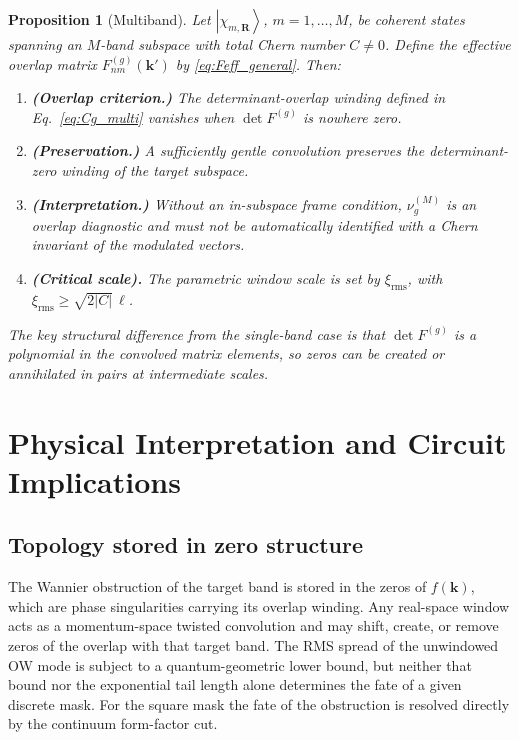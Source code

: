\documentclass[aps,prb,onecolumn,nofootinbib,superscriptaddress]{revtex4-2}
\newtheorem{proposition}{Proposition}
\newcommand{\mbf}[1]{\mathbf{#1}}
\newcommand{\ket}[1]{\left|#1\right\rangle}
\begin{document}
\begin{proposition}[Multiband]\label{prop:multi}
Let $\ket{\chi_{m,\mbf{R}}}$, $m=1,\ldots,M$, be coherent states spanning an $M$-band subspace with total Chern number $C\neq 0$. Define the effective overlap matrix $F^{(g)}_{nm}(\mbf{k}')$ by \eqref{eq:Feff_general}. Then:
\begin{enumerate}
\item[(i$'$)] \textbf{(Overlap criterion.)} The determinant-overlap winding defined in Eq.~\eqref{eq:Cg_multi} vanishes when $\det F^{(g)}$ is nowhere zero.
\item[(ii$'$)] \textbf{(Preservation.)} A sufficiently gentle convolution preserves the determinant-zero winding of the target subspace.
\item[(iii$'$)] \textbf{(Interpretation.)} Without an in-subspace frame condition, $\nu_g^{(M)}$ is an overlap diagnostic and must not be automatically identified with a Chern invariant of the modulated vectors.
\item[(iv$'$)] \textbf{(Critical scale).} The parametric window scale is set by $\xi_{\mathrm{rms}}$, with $\xi_{\mathrm{rms}}\geq\sqrt{2|C|}\,\ell$.
\end{enumerate}
The key structural difference from the single-band case is that $\det F^{(g)}$ is a polynomial in the convolved matrix elements, so zeros can be created or annihilated in pairs at intermediate scales.
\end{proposition}

\section{Physical Interpretation and Circuit Implications}
\label{sec:physics}

\subsection{Topology stored in zero structure}

The Wannier obstruction of the target band is stored in the zeros of $f(\mbf{k})$, which are phase singularities carrying its overlap winding. Any real-space window acts as a momentum-space twisted convolution and may shift, create, or remove zeros of the overlap with that target band.  The RMS spread of the unwindowed OW mode is subject to a quantum-geometric lower bound, but neither that bound nor the exponential tail length alone determines the fate of a given discrete mask.  For the square mask the fate of the obstruction is resolved directly by the continuum form-factor cut.
\end{document}
